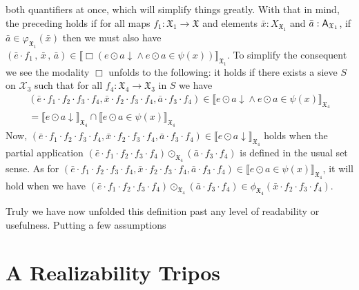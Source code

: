 \documentclass[12pt]{article}
\begin{document}
both quantifiers at once, which will simplify things greatly. With that in mind,
the preceding holds if for all maps
\(f_{1} : \mathfrak{X}_{1} \to \mathfrak{X}\) and elements
\(\bar{x} : X_{\mathfrak{X}_{1}}\) and \(\bar{a} : \mathsf{A}_{\mathfrak{X}_{1}}\), if
\( \bar{a} \in \varphi_{\mathfrak{X}_{1}}(\bar{x}) \) then we must also have
\(
 (\bar{e} \cdot f_{1}\,,\,\bar{x}\,,\,\bar{a}) \in \llbracket
    \Box ({e \odot a \downarrow} \land e \odot a \in \psi(x))
  \rrbracket_{\mathfrak{X}_{1}}
\).
To simplify the consequent we see the modality \(\Box\) unfolds to the following:
it holds if there exists a sieve \(S\) on \(\mathcal{X}_{3}\) such that for all
\(f_{4} : \mathfrak{X}_{4} \to \mathfrak{X}_{3}\) in \(S\) we have
\begin{multline*}
 (\bar{e} \cdot f_{1}\cdot f_{2}\cdot f_{3} \cdot f_{4}, \bar{x} \cdot f_{2} \cdot f_{3} \cdot f_{4}, \bar{a} \cdot f_{3} \cdot f_{4}) \in \llbracket
    {e \odot a \downarrow} \land e \odot a \in \psi(x)
  \rrbracket_{\mathfrak{X}_{4}}
  \\
  =
  {\llbracket {e \odot a \downarrow} \rrbracket_{\mathfrak{X}_{4}}}
  \cap
  {\llbracket e \odot a \in \psi(x) \rrbracket_{\mathfrak{X}_{4}}}
\end{multline*}
Now,
\((\bar{e} \cdot f_{1}\cdot f_{2}\cdot f_{3} \cdot f_{4}, \bar{x} \cdot f_{2} \cdot f_{3} \cdot f_{4}, \bar{a} \cdot f_{3} \cdot f_{4})
\in
\llbracket {e \odot a \downarrow} \rrbracket_{\mathfrak{X}_{4}}\)
holds when the partial application
\(
(\bar{e} \cdot f_{1}\cdot f_{2}\cdot f_{3} \cdot f_{4})
\odot_{\mathfrak{X}_{4}}
(\bar{a} \cdot f_{3} \cdot f_{4})
\)
is defined in the usual set sense. As for
\(
(\bar{e} \cdot f_{1}\cdot f_{2}\cdot f_{3} \cdot f_{4}, \bar{x} \cdot f_{2} \cdot f_{3} \cdot f_{4}, \bar{a} \cdot f_{3} \cdot f_{4})
\in
{\llbracket e \odot a \in \psi(x) \rrbracket_{\mathfrak{X}_{4}}}
\),
it will hold when we have
\(
(\bar{e} \cdot f_{1}\cdot f_{2}\cdot f_{3} \cdot f_{4})
\odot_{\mathfrak{X}_{4}}
(\bar{a} \cdot f_{3} \cdot f_{4})
\in
\phi_{\mathfrak{X}_{4}}(\bar{x} \cdot f_{2} \cdot f_{3} \cdot f_{4})
\).

Truly we have now unfolded this definition past any level of readability or
usefulness. Putting a few assumptions


\section{A Realizability Tripos}

\end{document}
